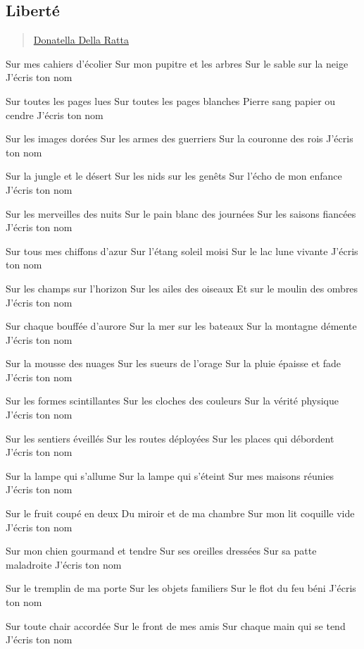\subsection{Liberté}\label{libertuxe9}

\begin{quote}
\hyperlink{donatella-della-ratta}{Donatella
Della Ratta}
\end{quote}

Sur mes cahiers d'écolier Sur mon pupitre et les arbres Sur le sable sur
la neige J'écris ton nom

Sur toutes les pages lues Sur toutes les pages blanches Pierre sang
papier ou cendre J'écris ton nom

Sur les images dorées Sur les armes des guerriers Sur la couronne des
rois J'écris ton nom

Sur la jungle et le désert Sur les nids sur les genêts Sur l'écho de mon
enfance J'écris ton nom

Sur les merveilles des nuits Sur le pain blanc des journées Sur les
saisons fiancées J'écris ton nom

Sur tous mes chiffons d'azur Sur l'étang soleil moisi Sur le lac lune
vivante J'écris ton nom

Sur les champs sur l'horizon Sur les ailes des oiseaux Et sur le moulin
des ombres J'écris ton nom

Sur chaque bouffée d'aurore Sur la mer sur les bateaux Sur la montagne
démente J'écris ton nom

Sur la mousse des nuages Sur les sueurs de l'orage Sur la pluie épaisse
et fade J'écris ton nom

Sur les formes scintillantes Sur les cloches des couleurs Sur la vérité
physique J'écris ton nom

Sur les sentiers éveillés Sur les routes déployées Sur les places qui
débordent J'écris ton nom

Sur la lampe qui s'allume Sur la lampe qui s'éteint Sur mes maisons
réunies J'écris ton nom

Sur le fruit coupé en deux Du miroir et de ma chambre Sur mon lit
coquille vide J'écris ton nom

Sur mon chien gourmand et tendre Sur ses oreilles dressées Sur sa patte
maladroite J'écris ton nom

Sur le tremplin de ma porte Sur les objets familiers Sur le flot du feu
béni J'écris ton nom

Sur toute chair accordée Sur le front de mes amis Sur chaque main qui se
tend J'écris ton nom

